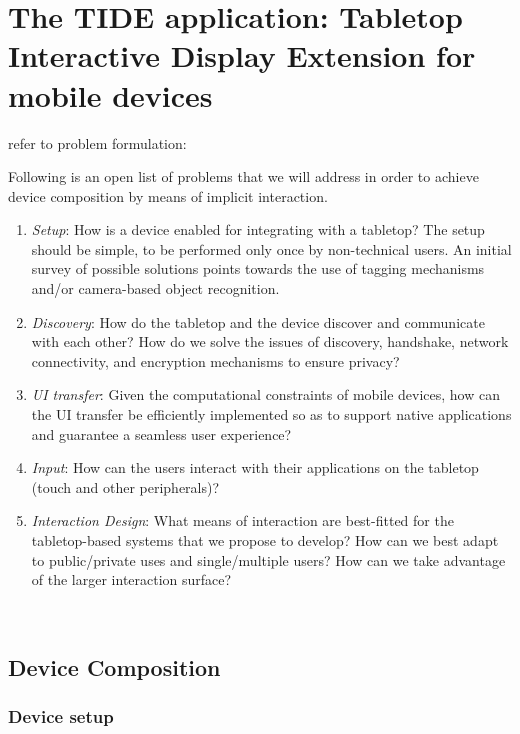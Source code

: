 

\chapter{The TIDE application: Tabletop Interactive Display Extension for mobile devices}

refer to problem formulation:

Following is an open list of problems that we will address in order to achieve device composition by means of implicit interaction.
\begin{enumerate}
\item{\emph{Setup}: How is a device enabled for integrating with a tabletop?
The setup should be simple, to be performed only once by non-technical users.
An initial survey of possible solutions points towards the use of tagging mechanisms and/or camera-based object recognition.}
\item{\emph{Discovery}: How do the tabletop and the device discover and communicate with each other?
How do we solve the issues of discovery, handshake, network connectivity, and encryption mechanisms to ensure privacy?}
\item{\emph{UI transfer}: Given the computational constraints of mobile devices, how can the UI transfer be efficiently implemented so as to support native applications and guarantee a seamless user experience?}
\item{\emph{Input}: How can the users interact with their applications on the tabletop (touch and other peripherals)?}
\item{\emph{Interaction Design}: What means of interaction are best-fitted for the tabletop-based systems that we propose to develop?
How can we best adapt to public/private uses and single/multiple users?
How can we take advantage of the larger interaction surface?}
\end{enumerate}

\hfill\\

\section{Device Composition}

\subsection{Device setup}

